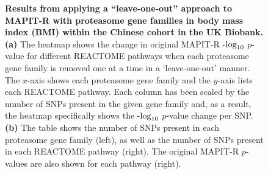 \documentclass[10pt]{article}
\def\log{{\rm log}}
\begin{document}
\begin{figure}[H]
\caption{\textbf{Results from applying a ``leave-one-out'' approach to MAPIT-R with proteasome gene families in body mass index (BMI) within the Chinese cohort in the UK Biobank.} \textbf{(a)} The heatmap shows the change in original MAPIT-R -$\log_{10}$ $p$-value for different REACTOME pathways when each proteasome gene family is removed one at a time in a `leave-one-out' manner. The $x$-axis shows each proteasome gene family and the $y$-axis lists each REACTOME pathway. Each column has been scaled by the number of SNPs present in the given gene family and, as a result, the heatmap specifically shows the -$\log_{10}$ $p$-value change per SNP. \textbf{(b)} The table shows the number of SNPs present in each proteasome gene family (left), as well as the number of SNPs present in each REACTOME pathway (right). The original MAPIT-R $p$-values are also shown for each pathway (right).}
\label{InterPath-Supp-Figure-Prot-Heatplots-Chinese}
\end{figure}
\clearpage
\end{document}
